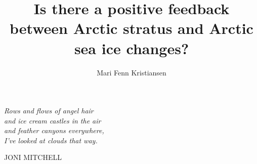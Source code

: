 \documentclass[11pt, a4paper]{book}
\newcommand{\boxcolor}{Blue}
\renewcommand{\textcolor}{White}
\begin{document}
\title{Is there a positive feedback between Arctic stratus and Arctic sea ice changes?}
\author{Mari Fenn Kristiansen}
\date{}

 \uiosloforside[kind=Master thesis in Geosciences Meteorology and oceanography, dept=Department of Geosciences, boxcolor=\boxcolor, textcolor=\textcolor, date=1st June 2015] 
 
\newlength\longest
\clearpage

\thispagestyle{empty}
\null\vfill

\settowidth{}
{\centering
\parbox{\longest}{%
  \raggedright{\huge\itshape%
   Rows and flows of angel hair \\ 
  and ice cream castles in the air \\
  and feather canyons everywhere, \\ 
  I've looked at clouds that way.\par\bigskip
  }   
  \raggedleft\Large\MakeUppercase{Joni Mitchell}\par%
}}

\vfill\vfill

\clearpage



\tableofcontents




\end{document}
